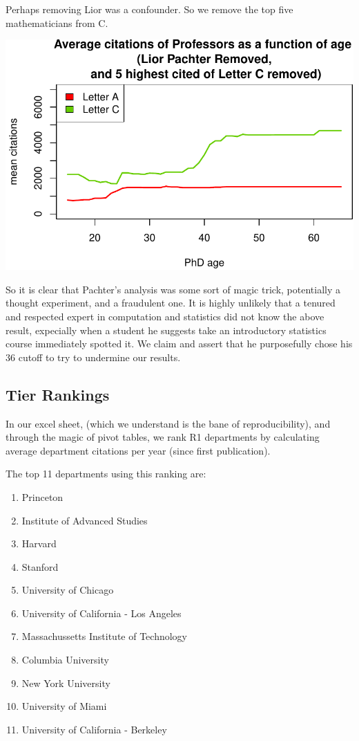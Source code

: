 \documentclass[]{article}
\begin{document}
Perhaps removing Lior was a confounder. So we remove the top five
mathematicians from C.

\includegraphics{index_files/figure-latex/unnamed-chunk-45-1.pdf}

So it is clear that Pachter's analysis was some sort of magic trick,
potentially a thought experiment, and a fraudulent one. It is highly
unlikely that a tenured and respected expert in computation and
statistics did not know the above result, expecially when a student he
suggests take an introductory statistics course immediately spotted it.
We claim and assert that he purposefully chose his 36 cutoff to try to
undermine our results.

\hypertarget{tier-rankings}{%
\subsection{Tier Rankings}\label{tier-rankings}}

In our excel sheet, (which we understand is the bane of
reproducibility), and through the magic of pivot tables, we rank R1
departments by calculating average department citations per year (since
first publication).

The top 11 departments using this ranking are:

\begin{enumerate}
\def\labelenumi{\arabic{enumi}.}
\item
  Princeton
\item
  Institute of Advanced Studies
\item
  Harvard
\item
  Stanford
\item
  University of Chicago
\item
  University of California - Los Angeles
\item
  Massachussetts Institute of Technology
\item
  Columbia University
\item
  New York University
\item
  University of Miami
\item
  University of California - Berkeley
\end{enumerate}
\end{document}
